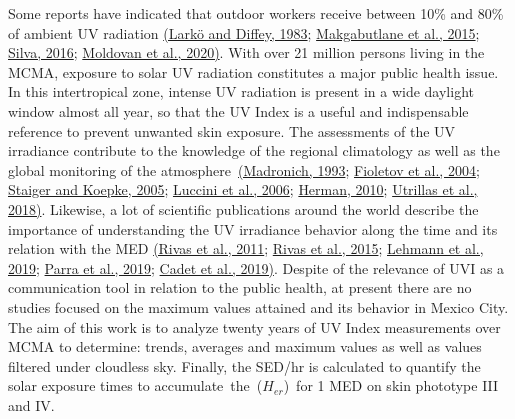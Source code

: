 \documentclass[10pt]{article}
\begin{document}
Some reports have indicated that outdoor workers receive between 10\%
and 80\% of ambient UV radiation \hyperref[csl:50]{(Larkö and Diffey, 1983}; \hyperref[csl:51]{Makgabutlane et al., 2015}; \hyperref[csl:52]{Silva, 2016}; \hyperref[csl:53]{Moldovan et al., 2020)}. With over 21
million persons living in the MCMA, exposure to solar UV radiation
constitutes a major public health issue. In this intertropical zone,
intense UV radiation is present in a wide daylight window almost all
year, so that the UV Index is a useful and indispensable reference to
prevent unwanted skin exposure. The assessments of the UV irradiance
contribute to the knowledge of the regional climatology as well as the
global monitoring of the atmosphere~\hyperref[csl:54]{(Madronich, 1993}; \hyperref[csl:55]{Fioletov et al., 2004}; \hyperref[csl:56]{Staiger and Koepke, 2005}; \hyperref[csl:57]{Luccini et al., 2006}; \hyperref[csl:28]{Herman, 2010}; \hyperref[csl:58]{Utrillas et al., 2018)}. Likewise, a lot
of scientific publications around the world describe the importance of
understanding the UV irradiance behavior along the time and its relation
with the MED \hyperref[csl:59]{(Rivas et al., 2011}; \hyperref[csl:60]{Rivas et al., 2015}; \hyperref[csl:32]{Lehmann et al., 2019}; \hyperref[csl:61]{Parra et al., 2019}; \hyperref[csl:62]{Cadet et al., 2019)}. Despite of the relevance of UVI as a
communication tool in relation to the public health, at present there
are no studies focused on the maximum values attained and its behavior
in Mexico City. The aim of this work is to analyze twenty years of UV
Index measurements over MCMA to determine: trends, averages and maximum
values as well as values filtered under cloudless sky. Finally, the
SED/hr is calculated to quantify the solar exposure times to
accumulate~the~(\(H_{er}\))~for 1 MED on skin phototype III and
IV.
\end{document}
